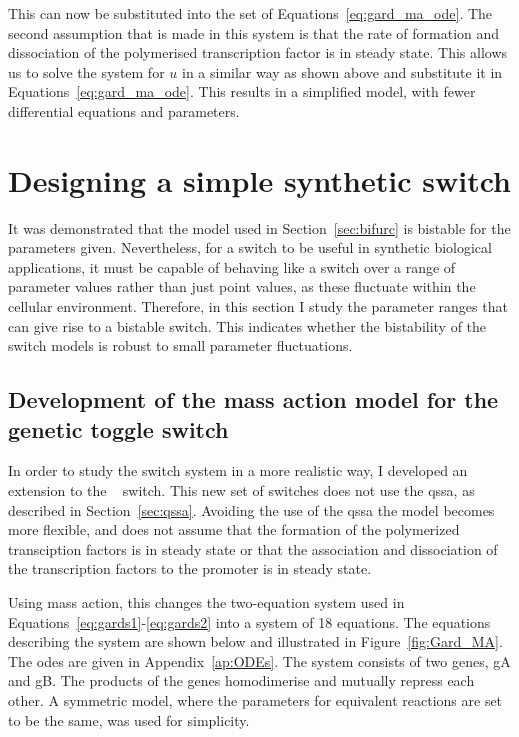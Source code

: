 \noindent This can now be substituted into the set of Equations~\ref{eq:gard_ma_ode}. The second assumption that is made in this system is that the rate of formation and dissociation of the polymerised transcription factor is in steady state. This allows us to solve the system for $u$ in a similar way as shown above and substitute it in Equations~\ref{eq:gard_ma_ode}. This results in a simplified model, with fewer differential equations and parameters.

\section{Designing a simple synthetic switch}
\label{sec:design_sim}

It was demonstrated that the model used in Section~\ref{sec:bifurc} is bistable for the parameters given. Nevertheless, for a switch to be useful in synthetic biological applications, it must be capable of behaving like a switch over a range of parameter values rather than just point values, as these fluctuate within the cellular environment. Therefore, in this section I study the parameter ranges that can give rise to a bistable switch. This indicates whether the bistability of the switch models is robust to small parameter fluctuations.


\subsection{Development of the mass action model for the genetic toggle switch}

In order to study the switch system in a more realistic way, I developed an extension to the ~\textcite{Gardner:2000vha} switch. This new set of switches does not use the \acrfull{qssa}, as described in Section~\ref{sec:qssa}. Avoiding the use of the \acrshort{qssa} the model becomes more flexible, and does not assume that the formation of the polymerized transciption factors is in steady state or that the association and dissociation of the transcription factors to the promoter is in steady state.  

Using mass action, this changes the two-equation system used in Equations~\ref{eq:gards1}-\ref{eq:gards2} into a system of 18 equations. The equations describing the system are shown below and illustrated in Figure~\ref{fig:Gard_MA}. The \acrshort{ode}s are given in Appendix~\ref{ap:ODEs}. The system consists of two genes, gA and gB. The products of the genes homodimerise and mutually repress each other. A symmetric model, where the parameters for equivalent reactions are set to be the same, was used for simplicity.

